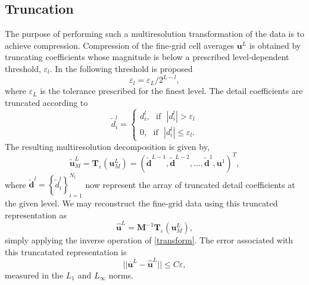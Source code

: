 \documentclass[]{article}
\begin{document}
    \subsection{Truncation}

        The purpose of performing such a multiresolution transformation of the
        data is to achieve compression. Compression of the fine-grid cell
        averages $\bm{u}^{L}$ is obtained by truncating coefficients whose
        magnitude is below a prescribed level-dependent threshold,
        $\varepsilon_{l}$.  In \cite{harten1994} the following threshold is
        proposed
        \begin{equation}
            \varepsilon_{l} = \varepsilon_{L} / 2^{L-l},
        \end{equation}
        where $\varepsilon_{L}$ is the tolerance prescribed for the finest
        level. The detail coefficients are truncated according to
        \begin{equation}
            \tilde{d}^{l}_{i} =
                \begin{cases}
                    d^{l}_{i}, \text{ } \text{if} \text{ } |d^{l}_{i}| > \varepsilon_{l} \\
                    0, \text{ } \text{if} \text{ } |d^{l}_{i}| \leq
                    \varepsilon_{l}.
                \end{cases}
        \end{equation}
        The resulting multiresolution decomposition is given by,
        \begin{equation}
            \tilde{\bm{u}}^{L}_{M} = \bm{T}_{\varepsilon}(\bm{u}^{L}_{M}) = \left(
            \tilde{\bm{d}}^{L-1}, \tilde{\bm{d}}^{L-2},
            \dots, \tilde{\bm{d}}^{1}, \bm{u}^{1} \right)^{T},
        \end{equation}
        where $\tilde{\bm{d}}^{l} =
        \left\{\tilde{d}^{l}_{i}\right\}_{i=1}^{N_{l}}$ now represent the array
        of truncated detail coefficients at the given level. We may reconstruct
        the fine-grid data using this truncated representation as
        \begin{equation}
            \hat{\bm{u}}^{L} = \bm{M}^{-1} \bm{T}_{\varepsilon}(\bm{u}^{L}_{M}),
        \end{equation}
        simply applying the inverse operation of \ref{transform}.  The error
        associated with this truncatated representation is
        \begin{equation}
            ||\overline{\bm{u}}^{L} - \hat{\bm{u}}^{L}|| \leq C \varepsilon,
        \end{equation}
        measured in the $L_{1}$ and $L_{\infty}$ norms.
\end{document}

